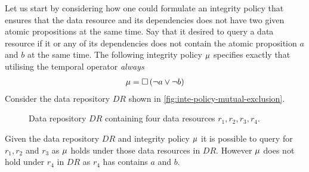 \begin{example}[]\label{ex:mutual-exclusion}
Let us start by considering how one could formulate an integrity policy that ensures that the data resource and its dependencies does not have two given atomic propositions at the same time. Say that it desired to query a data resource if it or any of its dependencies does not contain the atomic proposition $a$ and $b$ at the same time. The following integrity policy $\mu$ specifies exactly that utilising the temporal operator \emph{always}
\begin{align*}
    \mu =  \square \left( \lnot a \lor \lnot b \right)
\end{align*}
Consider the data repository $DR$ shown in \autoref{fig:inte-policy-mutual-exclusion}.
\begin{figure}[!ht]
    \begin{center}
        
        \caption{Data repository $DR$ containing four data resources $r_1, r_2, r_3, r_4$.}
        \label{fig:inte-policy-mutual-exclusion}
    \end{center}
\end{figure}
Given the data repository $DR$ and integrity policy $\mu$ it is possible to query for $r_1, r_2$ and $r_3$ as $\mu$ holds under those data resources in $DR$. However $\mu$ does not hold under $r_4$ in $DR$ as $r_4$ has contains $a$ and $b$.
\end{example}

